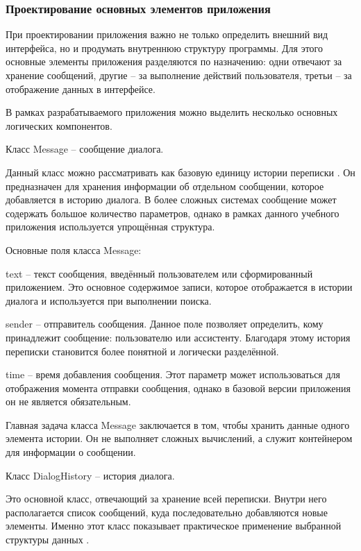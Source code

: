 \documentclass[12pt,a4paper]{article}
\begin{document}
\subsubsection{Проектирование основных элементов приложения}

При проектировании приложения важно не только определить внешний вид интерфейса, но и продумать внутреннюю структуру программы. Для этого основные элементы приложения разделяются по назначению: одни отвечают за хранение сообщений, другие -- за выполнение действий пользователя, третьи -- за отображение данных в интерфейсе.

В рамках разрабатываемого приложения можно выделить несколько основных логических компонентов.

Класс Message -- сообщение диалога.

Данный класс можно рассматривать как базовую единицу истории переписки \cite{ref6,ref9}. Он предназначен для хранения информации об отдельном сообщении, которое добавляется в историю диалога. В более сложных системах сообщение может содержать большое количество параметров, однако в рамках данного учебного приложения используется упрощённая структура.

Основные поля класса Message:

text -- текст сообщения, введённый пользователем или сформированный приложением. Это основное содержимое записи, которое отображается в истории диалога и используется при выполнении поиска.

sender -- отправитель сообщения. Данное поле позволяет определить, кому принадлежит сообщение: пользователю или ассистенту. Благодаря этому история переписки становится более понятной и логически разделённой.

time -- время добавления сообщения. Этот параметр может использоваться для отображения момента отправки сообщения, однако в базовой версии приложения он не является обязательным.

Главная задача класса Message заключается в том, чтобы хранить данные одного элемента истории. Он не выполняет сложных вычислений, а служит контейнером для информации о сообщении.

Класс DialogHistory -- история диалога.

Это основной класс, отвечающий за хранение всей переписки. Внутри него располагается список сообщений, куда последовательно добавляются новые элементы. Именно этот класс показывает практическое применение выбранной структуры данных \cite{ref6,ref10}.
\end{document}
